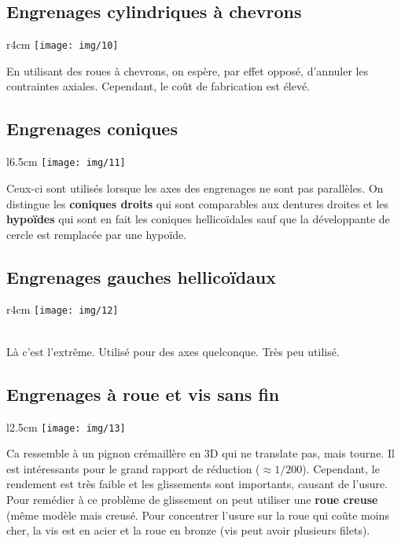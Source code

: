 \subsection{Engrenages cylindriques à chevrons}
	\begin{wrapfigure}[4]{r}{4cm}
	\vspace{-5mm}
	\texttt{[image: img/10]}
	\end{wrapfigure}	
	\noindent En utilisant des roues à chevrons, on espère, par effet opposé, d'annuler les contraintes axiales. Cependant, le coût de fabrication est élevé. 
	
\subsection{Engrenages coniques}
	\begin{wrapfigure}[5]{l}{6.5cm}
	\vspace{-5mm}
	\texttt{[image: img/11]}
	\end{wrapfigure}	
	\noindent Ceux-ci sont utilisés lorsque les axes des engrenages ne sont pas parallèles. On distingue les \textbf{coniques droits} qui sont comparables aux dentures droites et les \textbf{hypoïdes} qui sont en fait les coniques hellicoïdales sauf que la développante de cercle est remplacée par une hypoïde.
	
\subsection{Engrenages gauches hellicoïdaux}
	\begin{wrapfigure}[2]{r}{4cm}
	\texttt{[image: img/12]}
	\end{wrapfigure}	
	\ \\ Là c'est l'extrême. Utilisé pour des axes quelconque. Très peu utilisé. 

\newpage	
	
\subsection{Engrenages à roue et vis sans fin}
	\begin{wrapfigure}[6]{l}{2.5cm}
	\vspace{-5mm}
	\texttt{[image: img/13]}
	\end{wrapfigure}	
	\noindent Ca ressemble à un pignon crémaillère en 3D qui ne translate pas, mais tourne. Il est intéressants pour le grand rapport de réduction ($\approx 1/200$). Cependant, le rendement est très faible et les glissements sont importants, causant de l'usure. Pour remédier à ce problème de glissement on peut utiliser une \textbf{roue creuse} (même modèle mais creusé. Pour concentrer l'usure sur la roue qui coûte moins cher, la vis est en acier et la roue en bronze (vis peut avoir plusieurs filets).
	
